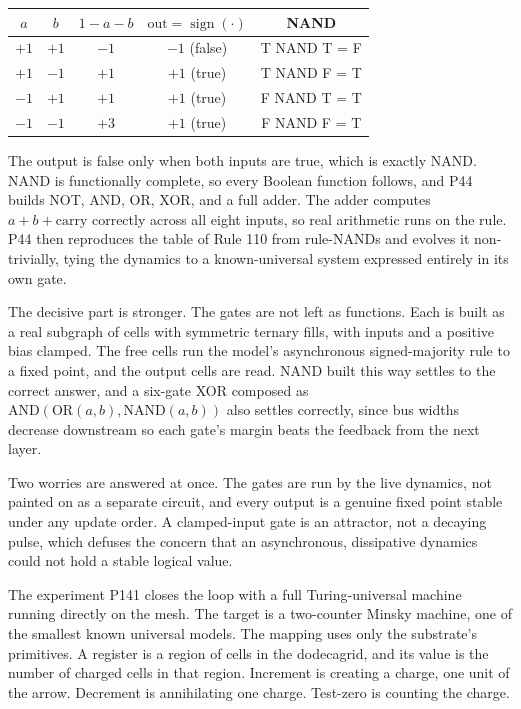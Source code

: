 \begin{center}
\begin{tabular}{ccccc}
\hline
$a$ & $b$ & $1 - a - b$ & $\mathrm{out} = \operatorname{sign}(\cdot)$ & NAND \\
\hline
$+1$ & $+1$ & $-1$ & $-1$ (false) & T NAND T = F \\
$+1$ & $-1$ & $+1$ & $+1$ (true) & T NAND F = T \\
$-1$ & $+1$ & $+1$ & $+1$ (true) & F NAND T = T \\
$-1$ & $-1$ & $+3$ & $+1$ (true) & F NAND F = T \\
\hline
\end{tabular}
\end{center}

The output is false only when both inputs are true, which is exactly NAND. NAND is functionally complete,
so every Boolean function follows, and P44 builds NOT, AND, OR, XOR, and a full adder. The adder computes
$a + b + \mathrm{carry}$ correctly across all eight inputs, so real arithmetic runs on the rule. P44 then
reproduces the table of Rule 110 from rule-NANDs and evolves it non-trivially, tying the dynamics to a
known-universal system expressed entirely in its own gate.

The decisive part is stronger. The gates are not left as functions. Each is built as a real subgraph of
cells with symmetric ternary fills, with inputs and a positive bias clamped. The free cells run the model's
asynchronous signed-majority rule to a fixed point, and the output cells are read. NAND built this way
settles to the correct answer, and a six-gate XOR composed as $\mathrm{AND}(\mathrm{OR}(a,b),
\mathrm{NAND}(a,b))$ also settles correctly, since bus widths decrease downstream so each gate's margin
beats the feedback from the next layer.

Two worries are answered at once. The gates are run by the live
dynamics, not painted on as a separate circuit, and every output is a genuine fixed point stable under any
update order. A clamped-input gate is an attractor, not a decaying pulse, which defuses the concern that an
asynchronous, dissipative dynamics could not hold a stable logical value.

The experiment P141 closes the loop with a full Turing-universal machine running directly on the mesh. The
target is a two-counter Minsky machine, one of the smallest known universal models. The mapping uses only
the substrate's primitives. A register is a region of cells in the dodecagrid, and its value is the number
of charged cells in that region. Increment is creating a charge, one unit of the arrow. Decrement is
annihilating one charge. Test-zero is counting the charge.

